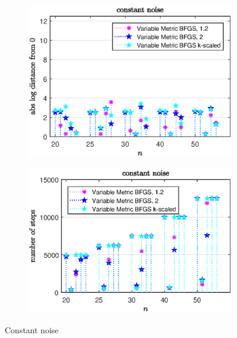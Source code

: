\begin{figure}[H]
	\begin{subfigure}{0.49\textwidth}
		\includegraphics[width=\textwidth]{Pictures/Plots/constant_noise_compb.eps}%
	\end{subfigure}
	\begin{subfigure}{0.49\textwidth}
		\includegraphics[width=\textwidth]{Pictures/Plots/steps_constant_noise_compb.eps}%
	\end{subfigure}
	\caption{Constant noise}%
	\label{fig_const_noise_comp_large}%
\end{figure}


